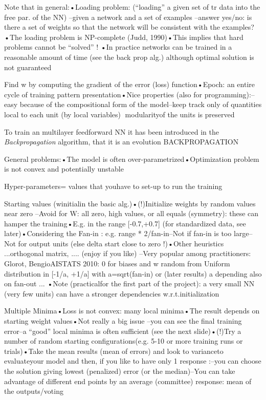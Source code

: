 Note that in general:•Loading problem: (“loading” a given set of tr data into the free par. of the NN) –given a network and a set of examples –answer yes/no: is there a set of weights so that the network will be consistent with the examples?•The loading problem is NP-complete (Judd, 1990)•This implies that hard problems cannot be “solved” ! •In practice networks can be trained in a reasonable amount of time (see the back prop alg.) although optimal solution is not guaranteed

Find  w by computing the gradient of the error (loss) function•Epoch: an entire cycle of training pattern presentation•Nice properties (also for programming):–easy because of the compositional form of the model–keep track only of quantities local to each unit (by local variables) modularityof the units is preserved

To train an multilayer feedforward NN it has been introduced in \cite{backpropagation} the \emph{Backpropagation} algorithm, that it is an evolution
BACKPROPAGATION

General problems:•The model is often over-parametrized•Optimization problem is not convex and potentially unstable

Hyper-parameters= values that youhave to set-up to run the training

Starting values (winitialin the basic alg.)•(!)Initialize weights by random values near zero –Avoid for W: all zero, high values, or all equals (symmetry): these can hamper the training•E.g. in the range [-0.7,+0.7] (for standardized data, see later)•Considering the Fan-in : e.g. range * 2/fan-in–Not if fan-in is too large–Not for output units (else delta start close to zero !)•Other heuristics ...orthogonal matrix, .... (enjoy if  you like) –Very popular among practitioners: Glorot, BengioAISTATS 2010: 0 for biases and w random from Uniform distribution in [-1/a, +1/a] with a=sqrt(fan-in) or (later results) a depending also on fan-out ... •Note (practicalfor the first part of the project): a very small NN (very few units) can have a stronger dependencies w.r.t.initialization

Multiple Minima•Loss is not convex: many local minima•The result depends on starting weight values•Not really a big issue –you can see the final training error–a “good” local minima is often sufficient (see the next slide)•(!)Try a number of random starting configurations(e.g. 5-10 or more training runs or trials)•Take the mean results (mean of errors) and look to varianceto evaluateyour model and then, if you like to have only 1 response :–you can choose the solution giving lowest (penalized) error (or the median)–You can take advantage of different end points by an average (committee) response: mean of the outputs/voting


